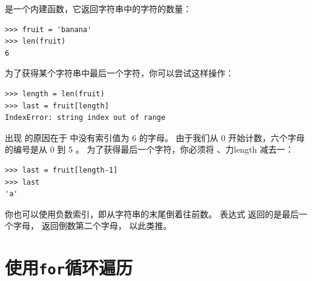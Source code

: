 
 是一个内建函数，它返回字符串中的字符的数量：

\begin{lstlisting}
>>> fruit = 'banana'
>>> len(fruit)
6
\end{lstlisting}

%
  

为了获得某个字符串中最后一个字符，你可以尝试这样操作：

\begin{lstlisting}
>>> length = len(fruit)
>>> last = fruit[length]
IndexError: string index out of range
\end{lstlisting}

%

出现  的原因在于  中没有索引值为 6 的字母。 由于我们从 0 开始计数，六个字母的编号是从 0 到 5 。 为了获得最后一个字符，你必须将 、力{length} 减去一：

\begin{lstlisting}
>>> last = fruit[length-1]
>>> last
'a'
\end{lstlisting}

%
  

你也可以使用负数索引，即从字符串的末尾倒着往前数。 表达式  返回的是最后一个字母，  返回倒数第二个字母， 以此类推。
  
  


\section{使用{\tt for}循环遍历}
\label{for}
  
  
  

